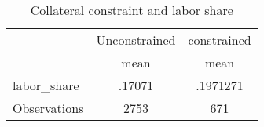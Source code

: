 \begin{table}[htbp]\centering
\def\sym#1{\ifmmode^{#1}\else\(^{#1}\)\fi}
\caption{Collateral constraint and labor share}
\begin{tabular}{l*{2}{c}}
\toprule
                    &\multicolumn{1}{c}{Unconstrained}&\multicolumn{1}{c}{constrained}\\
                    &        mean&        mean\\
\midrule
labor\_share         &      .17071&    .1971271\\
\midrule
Observations        &        2753&         671\\
\bottomrule
\end{tabular}
\end{table}
